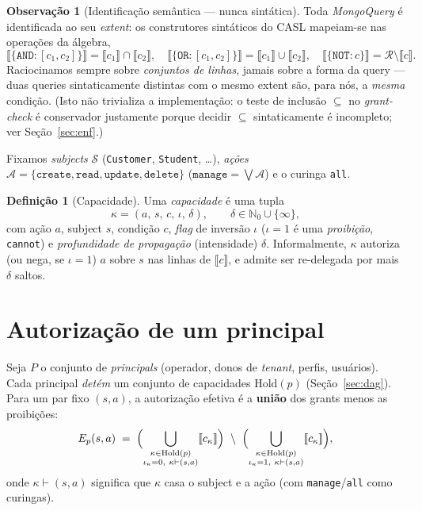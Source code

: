 \documentclass[11pt,a4paper]{article}
\theoremstyle{definition}
\newtheorem{definition}[theorem]{Definição}
\newtheorem{remark}[theorem]{Observação}
\newcommand{\R}{\mathcal{R}}
\newcommand{\ext}[1]{\llbracket #1 \rrbracket}
\newcommand{\Subj}{\mathcal{S}}
\newcommand{\Act}{\mathcal{A}}
\newcommand{\dep}{\delta}
\newcommand{\NN}{\mathbb{N}_0}
\begin{document}
\begin{remark}[Identificação semântica --- nunca sintática]\label{rem:extent}
Toda \emph{MongoQuery} é identificada ao seu \emph{extent}: os construtores
sintáticos do CASL mapeiam-se nas operações da álgebra,
\[
  \ext{\{\texttt{AND}{:}[c_1,c_2]\}}=\ext{c_1}\cap\ext{c_2},\quad
  \ext{\{\texttt{OR}{:}[c_1,c_2]\}}=\ext{c_1}\cup\ext{c_2},\quad
  \ext{\{\texttt{NOT}{:}c\}}=\R\setminus\ext{c}.
\]
Raciocinamos sempre sobre \emph{conjuntos de linhas}, jamais sobre a forma
da query --- duas queries sintaticamente distintas com o mesmo extent são,
para nós, a \emph{mesma} condição. (Isto não trivializa a implementação: o
teste de inclusão $\subseteq$ no \emph{grant-check} é conservador justamente
porque decidir $\subseteq$ sintaticamente é incompleto; ver
Seção~\ref{sec:enf}.)
\end{remark}

Fixamos \emph{subjects} $\Subj$ (\texttt{Customer}, \texttt{Student}, \dots),
\emph{ações} $\Act=\{\texttt{create},\texttt{read},\texttt{update},
\texttt{delete}\}$ ($\texttt{manage}=\bigvee\Act$) e o curinga \texttt{all}.

\begin{definition}[Capacidade]\label{def:cap}
Uma \emph{capacidade} é uma tupla
\[
  \kappa=(a,\,s,\,c,\,\iota,\,\dep), \qquad
  \dep\in\NN\cup\{\infty\},
\]
com ação $a$, subject $s$, condição $c$, \emph{flag} de inversão $\iota$
($\iota{=}1$ é uma \emph{proibição}, \texttt{cannot}) e \emph{profundidade de
propagação} (intensidade) $\dep$. Informalmente, $\kappa$ autoriza (ou nega,
se $\iota{=}1$) $a$ sobre $s$ nas linhas de $\ext{c}$, e admite ser
re-delegada por mais $\dep$ saltos.
\end{definition}

\section{Autorização de um principal}

Seja $P$ o conjunto de \emph{principals} (operador, donos de \emph{tenant},
perfis, usuários). Cada principal \emph{detém} um conjunto de capacidades
$\mathrm{Hold}(p)$ (Seção~\ref{sec:dag}). Para um par fixo $(s,a)$, a
autorização efetiva é a \textbf{união} dos grants menos as proibições:
\[
  E_p(s,a)\;=\;
  \Bigl(\bigcup_{\substack{\kappa\in\mathrm{Hold}(p)\\ \iota_\kappa=0,\ \kappa\vdash(s,a)}}\ext{c_\kappa}\Bigr)
  \ \setminus\
  \Bigl(\bigcup_{\substack{\kappa\in\mathrm{Hold}(p)\\ \iota_\kappa=1,\ \kappa\vdash(s,a)}}\ext{c_\kappa}\Bigr),
\]
onde $\kappa\vdash(s,a)$ significa que $\kappa$ casa o subject e a ação
(com \texttt{manage}/\texttt{all} como curingas).
\end{document}
